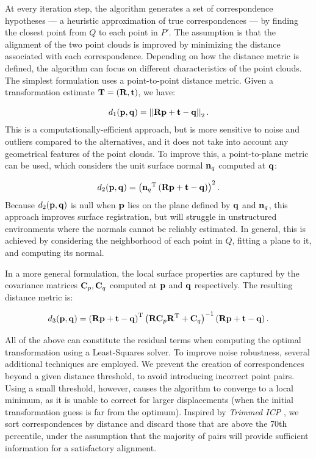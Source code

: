 At every iteration step, the algorithm generates a set of correspondence hypotheses --- a heuristic approximation of true correspondences --- by finding the closest point from $Q$ to each point in $P'$. The assumption is that the alignment of the two point clouds is improved by minimizing the distance associated with each correspondence. Depending on how the distance metric is defined, the algorithm can focus on different characteristics of the point clouds. The simplest formulation uses a point-to-point distance metric.
Given a transformation estimate $\mathbf{T} = \left(\mathbf{R}, \mathbf{t}\right)$, we have:

\begin{equation}
	d_{1}(\mathbf{p}, \mathbf{q}) = \left|\left|{\mathbf{R}\mathbf{p} + \mathbf{t} - \mathbf{q}}\right|\right|_2
	\text{.}
\end{equation}
This is a computationally-efficient approach, but is more sensitive to noise and outliers compared to the alternatives, and it does not take into account any geometrical features of the point clouds. To improve this, a point-to-plane metric \cite{chen1991pointtoplane} can be used, which considers the unit surface normal $\mathbf{n}_{q}$ computed at $\mathbf{q}$:

\begin{equation}
	d_{2}(\mathbf{p}, \mathbf{q}) = \left({\mathbf{n}_{q}}^\text{T}\left(\mathbf{R}\mathbf{p} + \mathbf{t} - \mathbf{q}\right)\right)^2
	\text{.}
\end{equation}
Because $d_{2}(\mathbf{p}, \mathbf{q})$ is null when $\mathbf{p}$ lies on the plane defined by $\mathbf{q}$ and $\mathbf{n}_{q}$, this approach improves surface registration, but will struggle in unstructured environments where the normals cannot be reliably estimated. In general, this is achieved by considering the neighborhood of each point in $Q$, fitting a plane to it, and computing its normal.

In a more general formulation, the local surface properties are captured by the covariance matrices $\mathbf{C}_{p}, \mathbf{C}_{q}$ computed at $\mathbf{p}$ and $\mathbf{q}$ respectively. The resulting distance metric \cite{segal2009generalized} is:

\begin{equation}
	d_{3}(\mathbf{p}, \mathbf{q}) =
	{\left(\mathbf{R}\mathbf{p} + \mathbf{t} - \mathbf{q}\right)}^\text{T}
	\left(
	\mathbf{R} \mathbf{C}_{p} {\mathbf{R}}^\text{T} + \mathbf{C}_{q}
	\right)^{-1}
	\left(\mathbf{R}\mathbf{p} + \mathbf{t} - \mathbf{q}\right)
	\text{.}
\end{equation}

All of the above can constitute the residual terms when computing the optimal transformation using a Least-Squares solver. To improve noise robustness, several additional techniques are employed. We prevent the creation of correspondences beyond a given distance threshold, to avoid introducing incorrect point pairs. Using a small threshold, however, causes the algorithm to converge to a local minimum, as it is unable to correct for larger displacements (\eg when the initial transformation guess is far from the optimum). Inspired by \emph{Trimmed ICP} \cite{trimmedicp}, we sort correspondences by distance and discard those that are above the 70th percentile, under the assumption that the majority of pairs will provide sufficient information for a satisfactory alignment.

